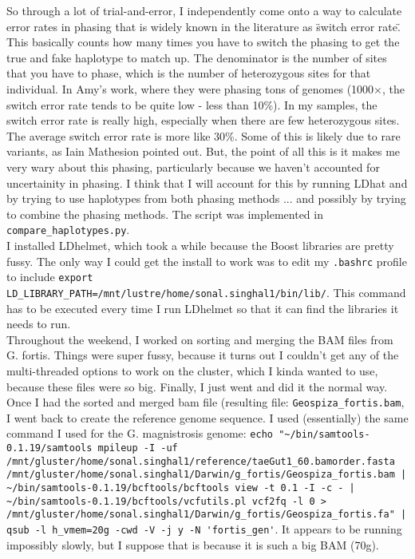\documentclass[idxtotoc,hyperref,openany,oneside]{labbook} %
\begin{document}
So through a lot of trial-and-error, I independently come onto a way to calculate error rates in phasing that is widely known in the literature as \"switch error rate\". This basically counts how many times you have to switch the phasing to get the true and fake haplotype to match up. The denominator is the number of sites that you have to phase, which is the number of heterozygous sites for that individual. In Amy's work, where they were phasing tons of genomes (1000$\times$, the switch error rate tends to be quite low - less than 10\%). In my samples, the switch error rate is really high, especially when there are few heterozygous sites. The average switch error rate is more like 30\%. Some of this is likely due to rare variants, as Iain Mathesion pointed out. But, the point of all this is it makes me very wary about this phasing, particularly because we haven't accounted for uncertainity in phasing. I think that I will account for this by running LDhat and by trying to use haplotypes from both phasing methods ... and possibly by trying to combine the phasing methods. The script was implemented in \verb+compare_haplotypes.py+. \\

I installed LDhelmet, which took a while because the Boost libraries are pretty fussy. The only way I could get the install to work was to edit my \verb+.bashrc+ profile to include \verb+export LD_LIBRARY_PATH=/mnt/lustre/home/sonal.singhal1/bin/lib/+. This command has to be executed every time I run LDhelmet so that it can find the libraries it needs to run. \\

Throughout the weekend, I worked on sorting and merging the BAM files from G. fortis. Things were super fussy, because it turns out I couldn't get any of the multi-threaded options to work on the cluster, which I kinda wanted to use, because these files were so big. Finally, I just went and did it the normal way. Once I had the sorted and merged bam file (resulting file: \verb+Geospiza_fortis.bam+, I went back to create the reference genome sequence. I used (essentially) the same command I used for the G. magnistrosis genome: \verb+echo "~/bin/samtools-0.1.19/samtools mpileup -I -uf /mnt/gluster/home/sonal.singhal1/reference/taeGut1_60.bamorder.fasta /mnt/gluster/home/sonal.singhal1/Darwin/g_fortis/Geospiza_fortis.bam | ~/bin/samtools-0.1.19/bcftools/bcftools view -t 0.1 -I -c - | ~/bin/samtools-0.1.19/bcftools/vcfutils.pl vcf2fq -l 0 > /mnt/gluster/home/sonal.singhal1/Darwin/g_fortis/Geospiza_fortis.fa" | qsub -l h_vmem=20g -cwd -V -j y -N 'fortis_gen'+. It appears to be running impossibly slowly, but I suppose that is because it is such a big BAM (70g). \\
\end{document}

